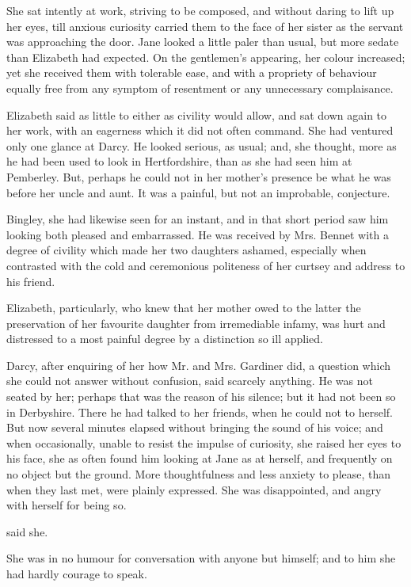 She sat intently at work, striving to be composed, and without daring to lift up her eyes, till anxious curiosity carried them to the face of her sister as the servant was approaching the door. Jane looked a little paler than usual, but more sedate than Elizabeth had expected. On the gentlemen's appearing, her colour increased; yet she received them with tolerable ease, and with a propriety of behaviour equally free from any symptom of resentment or any unnecessary complaisance.

Elizabeth said as little to either as civility would allow, and sat down again to her work, with an eagerness which it did not often command. She had ventured only one glance at Darcy. He looked serious, as usual; and, she thought, more as he had been used to look in Hertfordshire, than as she had seen him at Pemberley. But, perhaps he could not in her mother's presence be what he was before her uncle and aunt. It was a painful, but not an improbable, conjecture.

Bingley, she had likewise seen for an instant, and in that short period saw him looking both pleased and embarrassed. He was received by Mrs. Bennet with a degree of civility which made her two daughters ashamed, especially when contrasted with the cold and ceremonious politeness of her curtsey and address to his friend.

Elizabeth, particularly, who knew that her mother owed to the latter the preservation of her favourite daughter from irremediable infamy, was hurt and distressed to a most painful degree by a distinction so ill applied.

Darcy, after enquiring of her how Mr. and Mrs. Gardiner did, a question which she could not answer without confusion, said scarcely anything. He was not seated by her; perhaps that was the reason of his silence; but it had not been so in Derbyshire. There he had talked to her friends, when he could not to herself. But now several minutes elapsed without bringing the sound of his voice; and when occasionally, unable to resist the impulse of curiosity, she raised her eyes to his face, she as often found him looking at Jane as at herself, and frequently on no object but the ground. More thoughtfulness and less anxiety to please, than when they last met, were plainly expressed. She was disappointed, and angry with herself for being so.

 said she. 

She was in no humour for conversation with anyone but himself; and to him she had hardly courage to speak.

